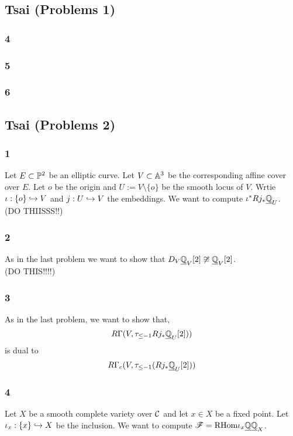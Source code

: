 \documentclass[12pt]{article}
\begin{document}
\subsection{Tsai (Problems 1)}

\subsubsection*{4}

\subsubsection*{5}

\subsubsection*{6}

\subsection{Tsai (Problems 2)}

\subsubsection*{1}

Let $E \subset \P^2$ be an elliptic curve. Let $V \subset \A^3$ be the corresponding affine cover over $E$. Let $o$ be the origin and $U := V \setminus \{ o \}$ be the smooth locus of $V$. Wrtie $\iota : \{ o \} \embed V$ and $j : U \embed V$ the embeddings. We want to compute $\iota^* R j_* \underline{\Q}_U$.
\bigskip\\
(DO THIISSS!!)

\subsubsection*{2}

As in the last problem we want to show that $D_V \underline{\Q}_V[2] \not\cong \underline{\Q}_V[2]$.
\bigskip\\
(DO THIS!!!!)

\subsubsection*{3}

As in the last problem, we want to show that,
\[ R\Gamma(V, \tau_{\le -1} R j_* \underline{\Q}_U[2])) \]
is dual to
\[ R \Gamma_c(V, \tau_{\le -1}(Rj_* \underline{\Q}_U[2])) \]

\subsubsection*{4}

Let $X$ be a smooth complete variety over $\mathbb{\C}$ and let $x \in X$ be a fixed point. Let $\iota_x : \{ x \} \embed X$ be the inclusion. We want to compute $\F = \mathrm{RHom}{}{\iota_x \underline{\Q}}{\underline{\Q}_X}$.
\end{document}
